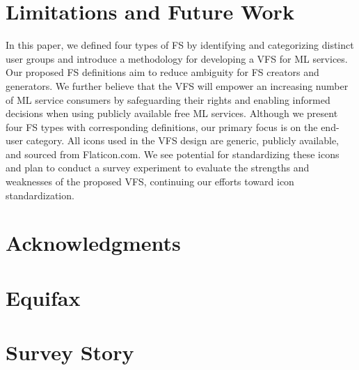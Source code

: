 \documentclass[manuscript,review,anonymous]{acmart}
\begin{document}
\section{Limitations and Future Work}

	In this paper, we defined four types of FS by identifying and categorizing distinct user groups and introduce a methodology for developing a VFS for ML services. Our proposed FS definitions aim to reduce ambiguity for FS creators and generators. We further believe that the VFS will empower an increasing number of ML service consumers by safeguarding their rights and enabling informed decisions when using publicly available free ML services. Although we present four FS types with corresponding definitions, our primary focus is on the end-user category. All icons used in the VFS design are generic, publicly available, and sourced from Flaticon.com. We see potential for standardizing these icons and plan to conduct a survey experiment to evaluate the strengths and weaknesses of the proposed VFS, continuing our efforts toward icon standardization.


\section{Acknowledgments}




\appendix

\section{Equifax} \label{appendix:a}


\section{Survey Story}
\end{document}
